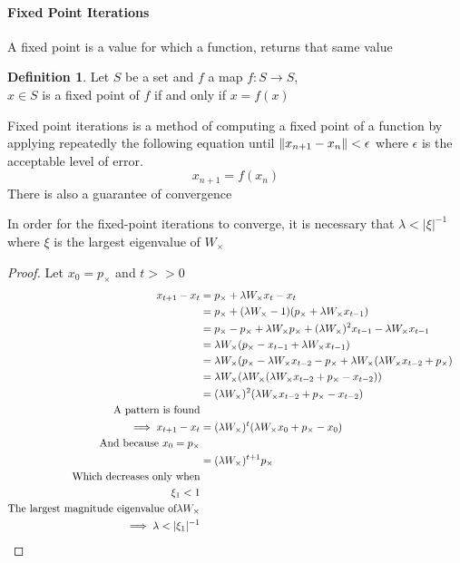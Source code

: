 \documentclass{article}
\DeclarePairedDelimiter{\norm}{\lVert}{\rVert}
\theoremstyle{definition}
\newtheorem{definition}{Definition}
\begin{document}
\paragraph{Fixed Point Iterations}
A fixed point is a value for which a function, returns that same value 
\begin{definition}
	Let $S$ be a set and $f$ a map $f : S \rightarrow S$,\\
	$x \in S$ is a fixed point of $f$ if and only if $x=f(x)$ 
\end{definition}
Fixed point iterations is a method of computing a fixed point of a function by applying repeatedly the following equation until $\norm{x_{n+1}-x_{n}}<\epsilon$ where $\epsilon$ is the acceptable level of error.
\begin{equation}
	x_{n+1} = f(x_n)
\end{equation}
There is also a guarantee of convergence 
\begin{theoremrep}
	In order for the fixed-point iterations to converge, it is necessary that $\lambda<|\xi|^{-1}$ where $\xi$ is the largest eigenvalue of $W_\times$
\end{theoremrep}
\begin{proof}
  Let $x_0=p_\times$ and $t>>0$
  \begin{align*}
      x_{t+1}-x_t &= p_\times+\lambda W_{\times} x_t - x_t &\\
      &= p_{\times}+(\lambda W_{\times} - 1)(p_{\times}+\lambda W_{\times} x_{t-1})\\
      &= p_{\times} - p_{\times} + \lambda W_{\times}p_{\times} + (\lambda W_{\times})^2 x_{t-1} - \lambda W_{\times} x_{t-1}\\
      &= \lambda W_{\times}(p_{\times}-x_{t-1}+\lambda W_{\times} x_{t-1}) \\
      &= \lambda W_{\times}(p_{\times}-\lambda W_{\times} x_{t-2} - p_{\times} + \lambda W_{\times}(\lambda W_{\times} x_{t-2} +p_{\times}) \\
      &= \lambda W_{\times} ( \lambda W_{\times} (\lambda W_{\times} x_{t-2}+p_{\times}-x_{t-2})) \\
      &= (\lambda W_{\times})^2(\lambda W_{\times} x_{t-2}+p_{\times} - x_{t-2}) & \\
      \text{A pattern is found}\\
      \implies x_{t+1}-x_t &= (\lambda W_{\times})^t (\lambda W_{\times} x_0 + p_{\times} - x_0) & \\
      \text{And because } x_0 = p_{\times}\\
      &= (\lambda W_{\times})^{t+1} p_{\times}\\
      \text{Which decreases only when}\\
      \xi_1 < 1\\
      \text{The largest magnitude eigenvalue of} \lambda W_{\times}\\
      \implies \lambda < |\xi_1|^{-1}
      && \qedhere
  \end{align*}
\end{proof}
\end{document}
